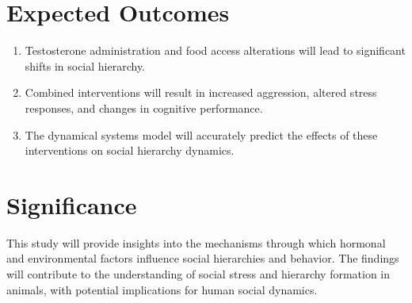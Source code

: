 \documentclass[english, a4paper, 11pt]{article}
\begin{document}
\section*{Expected Outcomes}
\begin{enumerate}
	\item Testosterone administration and food access alterations will lead to significant shifts in social hierarchy.
	\item Combined interventions will result in increased aggression, altered stress responses, and changes in cognitive performance.
	\item The dynamical systems model will accurately predict the effects of these interventions on social hierarchy dynamics.
\end{enumerate}

\section*{Significance}
This study will provide insights into the mechanisms through which hormonal and environmental factors influence social hierarchies and behavior. The findings will contribute to the understanding of social stress and hierarchy formation in animals, with potential implications for human social dynamics.
\end{document}
